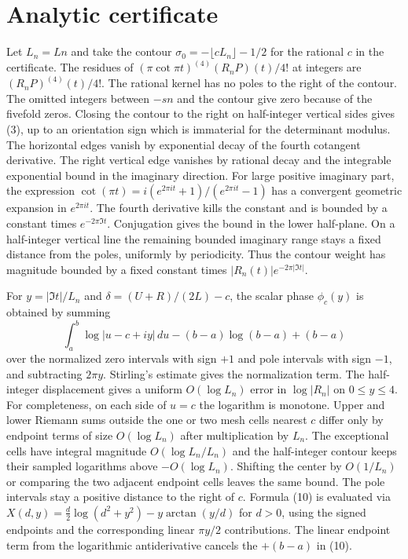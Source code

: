\IfFileExists{TS1cmr.fd}{\documentclass[11pt]{article}}
\begin{document}
\section{Analytic certificate}
Let \(L_n=Ln\) and take the contour
\(\sigma_0=-\lfloor c L_n\rfloor-1/2\) for the rational \(c\)
in the certificate. The residues of
\((\pi\cot\pi t)^{(4)}(R_n P)(t)/4!\) at integers are
\((R_nP)^{(4)}(t)/4!\).
The rational kernel has no poles to the right of the contour.
The omitted integers between \(-sn\) and the contour give zero
because of the fivefold zeros. Closing the contour to the right
on half-integer vertical sides gives (3), up to an orientation
sign which is immaterial for the determinant modulus. The
horizontal edges vanish by exponential decay of the fourth
cotangent derivative. The right vertical edge vanishes by
rational decay and the integrable exponential bound in the
imaginary direction. For large positive imaginary part, the expression
\(\cot(\pi t)=i(e^{2\pi it}+1)/(e^{2\pi it}-1)\)
has a convergent geometric expansion in \(e^{2\pi it}\).
The fourth derivative kills the constant and is bounded by a
constant times \(e^{-2\pi\Im t}\). Conjugation gives the
bound in the lower half-plane. On a half-integer vertical line
the remaining bounded imaginary range stays a fixed distance
from the poles, uniformly by periodicity.
Thus the contour weight has magnitude
bounded by a fixed constant times \(|R_n(t)|e^{-2\pi|\Im t|}\).

For \(y=|\Im t|/L_n\) and \(\delta=(U+R)/(2L)-c\), the scalar
phase \(\phi_c(y)\) is obtained by summing
\[
 \int_a^b\log|u-c+iy|\,du-(b-a)\log(b-a)+(b-a)
 \tag{10}
\]
over the normalized zero intervals with sign \(+1\) and pole
intervals with sign \(-1\), and subtracting \(2\pi y\).
Stirling's estimate gives the normalization term. The
half-integer displacement gives a uniform \(O(\log L_n)\)
error in \(\log|R_n|\) on \(0\le y\le4\).
For completeness, on each side of \(u=c\) the logarithm is
monotone. Upper and lower Riemann sums outside the one or two
mesh cells nearest \(c\) differ only by endpoint terms of size
\(O(\log L_n)\) after multiplication by \(L_n\).
The exceptional cells have integral magnitude
\(O(\log L_n/L_n)\) and the half-integer contour keeps their
sampled logarithms above \(-O(\log L_n)\).
Shifting the center by \(O(1/L_n)\) or comparing the two
adjacent endpoint cells leaves the same bound.
The pole intervals stay a positive distance to the right of
\(c\). Formula (10) is evaluated via
\(X(d,y)=\frac d2\log(d^2+y^2)-y\arctan(y/d)\) for \(d>0\),
using the signed endpoints and the corresponding linear
\(\pi y/2\) contributions. The linear endpoint term from the
logarithmic antiderivative cancels the \(+(b-a)\) in (10).
\end{document}
